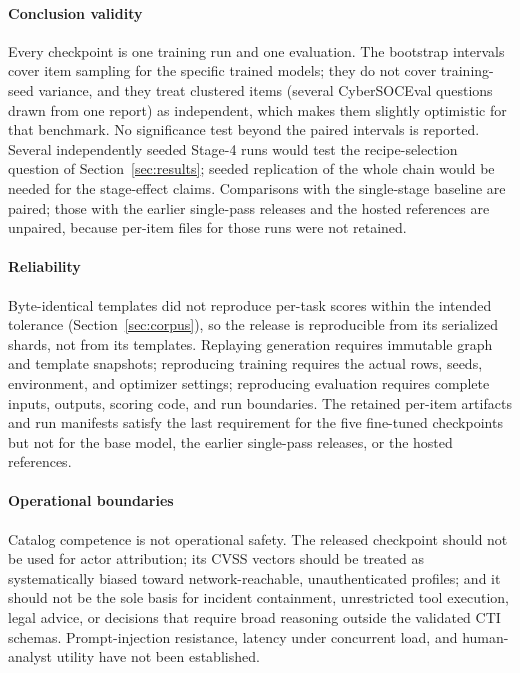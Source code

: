 \documentclass[a4paper,fleqn]{cas-dc}
\begin{document}
\paragraph{Conclusion validity}
Every checkpoint is one training run and one evaluation. The bootstrap intervals cover item sampling for the specific trained models; they do not cover training-seed variance, and they treat clustered items (several CyberSOCEval questions drawn from one report) as independent, which makes them slightly optimistic for that benchmark. No significance test beyond the paired intervals is reported. Several independently seeded Stage-4 runs would test the recipe-selection question of Section~\ref{sec:results}; seeded replication of the whole chain would be needed for the stage-effect claims. Comparisons with the single-stage baseline are paired; those with the earlier single-pass releases and the hosted references are unpaired, because per-item files for those runs were not retained.

\paragraph{Reliability}
Byte-identical templates did not reproduce per-task scores within the intended tolerance (Section~\ref{sec:corpus}), so the release is reproducible from its serialized shards, not from its templates. Replaying generation requires immutable graph and template snapshots; reproducing training requires the actual rows, seeds, environment, and optimizer settings; reproducing evaluation requires complete inputs, outputs, scoring code, and run boundaries. The retained per-item artifacts and run manifests satisfy the last requirement for the five fine-tuned checkpoints but not for the base model, the earlier single-pass releases, or the hosted references.

\paragraph{Operational boundaries}
Catalog competence is not operational safety. The released checkpoint should not be used for actor attribution; its CVSS vectors should be treated as systematically biased toward network-reachable, unauthenticated profiles; and it should not be the sole basis for incident containment, unrestricted tool execution, legal advice, or decisions that require broad reasoning outside the validated CTI schemas. Prompt-injection resistance, latency under concurrent load, and human-analyst utility have not been established.
\end{document}
